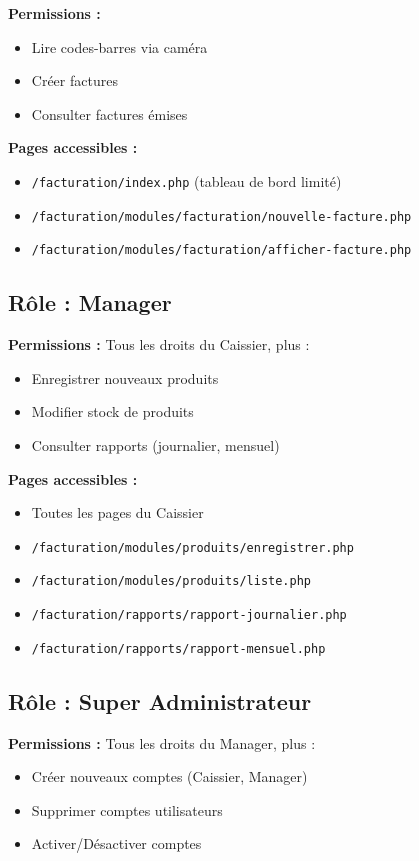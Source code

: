 \documentclass[12pt,a4paper]{report}
\begin{document}
\textbf{Permissions :}
\begin{itemize}
    \item Lire codes-barres via caméra
    \item Créer factures
    \item Consulter factures émises
\end{itemize}

\textbf{Pages accessibles :}
\begin{itemize}
    \item \texttt{/facturation/index.php} (tableau de bord limité)
    \item \texttt{/facturation/modules/facturation/nouvelle-facture.php}
    \item \texttt{/facturation/modules/facturation/afficher-facture.php}
\end{itemize}

\subsection{Rôle : Manager}

\textbf{Permissions :} Tous les droits du Caissier, plus :
\begin{itemize}
    \item Enregistrer nouveaux produits
    \item Modifier stock de produits
    \item Consulter rapports (journalier, mensuel)
\end{itemize}

\textbf{Pages accessibles :}
\begin{itemize}
    \item Toutes les pages du Caissier
    \item \texttt{/facturation/modules/produits/enregistrer.php}
    \item \texttt{/facturation/modules/produits/liste.php}
    \item \texttt{/facturation/rapports/rapport-journalier.php}
    \item \texttt{/facturation/rapports/rapport-mensuel.php}
\end{itemize}

\subsection{Rôle : Super Administrateur}

\textbf{Permissions :} Tous les droits du Manager, plus :
\begin{itemize}
    \item Créer nouveaux comptes (Caissier, Manager)
    \item Supprimer comptes utilisateurs
    \item Activer/Désactiver comptes
\end{itemize}
\end{document}
